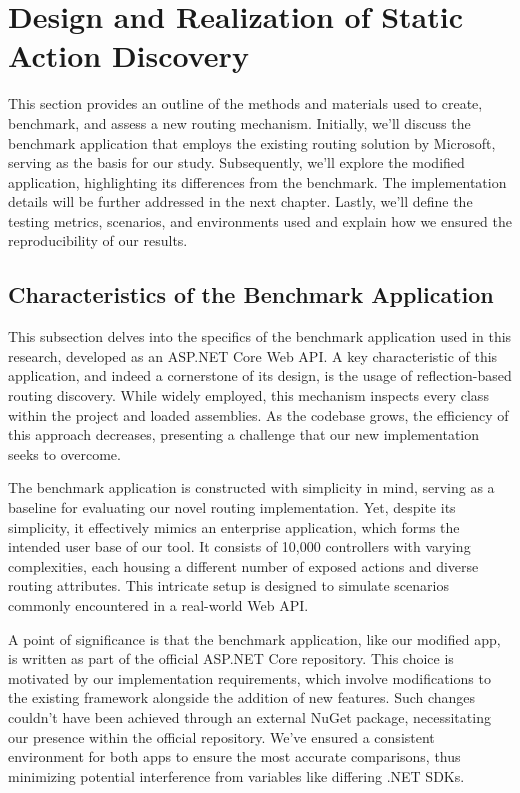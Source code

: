 \chapter{Design and Realization of Static Action Discovery}

This section provides an outline of the methods and materials used to create, benchmark, and assess a new routing mechanism. Initially, we'll discuss the benchmark application that employs the existing routing solution by Microsoft, serving as the basis for our study. Subsequently, we'll explore the modified application, highlighting its differences from the benchmark. The implementation details will be further addressed in the next chapter. Lastly, we'll define the testing metrics, scenarios, and environments used and explain how we ensured the reproducibility of our results.


\section{Characteristics of the Benchmark Application}

This subsection delves into the specifics of the benchmark application used in this research, developed as an ASP.NET Core Web API. A key characteristic of this application, and indeed a cornerstone of its design, is the usage of reflection-based routing discovery. While widely employed, this mechanism inspects every class within the project and loaded assemblies. As the codebase grows, the efficiency of this approach decreases, presenting a challenge that our new implementation seeks to overcome.

The benchmark application is constructed with simplicity in mind, serving as a baseline for evaluating our novel routing implementation. Yet, despite its simplicity, it effectively mimics an enterprise application, which forms the intended user base of our tool. It consists of 10,000 controllers with varying complexities, each housing a different number of exposed actions and diverse routing attributes. This intricate setup is designed to simulate scenarios commonly encountered in a real-world Web API.

A point of significance is that the benchmark application, like our modified app, is written as part of the official ASP.NET Core repository. This choice is motivated by our implementation requirements, which involve modifications to the existing framework alongside the addition of new features. Such changes couldn't have been achieved through an external NuGet package, necessitating our presence within the official repository. We've ensured a consistent environment for both apps to ensure the most accurate comparisons, thus minimizing potential interference from variables like differing .NET SDKs.

